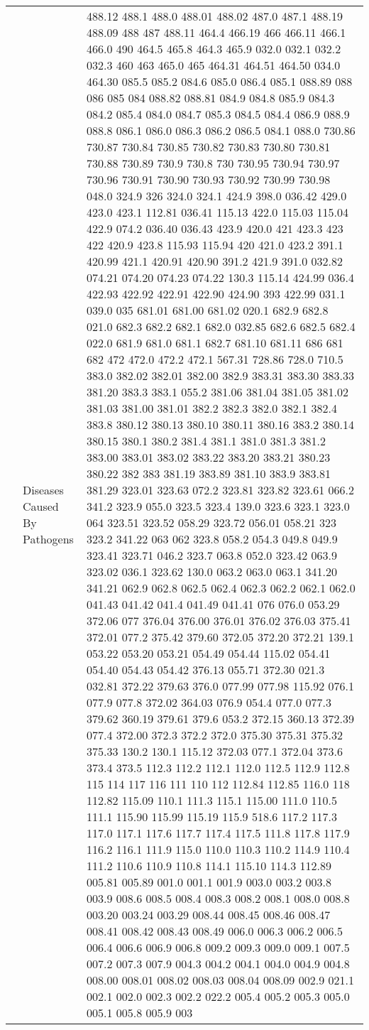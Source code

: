 \begin{longtable}{|R{.05in}|L{.5in}||L{5.75in}|}
    & Diseases Caused By Pathogens &  488.12 488.1 488.0 488.01 488.02 487.0 487.1 488.19 488.09 488 487 488.11 464.4 466.19 466 466.11 466.1 466.0 490 464.5 465.8 464.3 465.9 032.0 032.1 032.2 032.3 460 463 465.0 465 464.31 464.51 464.50 034.0 464.30 085.5 085.2 084.6 085.0 086.4 085.1 088.89 088 086 085 084 088.82 088.81 084.9 084.8 085.9 084.3 084.2 085.4 084.0 084.7 085.3 084.5 084.4 086.9 088.9 088.8 086.1 086.0 086.3 086.2 086.5 084.1 088.0 730.86 730.87 730.84 730.85 730.82 730.83 730.80 730.81 730.88 730.89 730.9 730.8 730 730.95 730.94 730.97 730.96 730.91 730.90 730.93 730.92 730.99 730.98 048.0 324.9 326 324.0 324.1 424.9 398.0 036.42 429.0 423.0 423.1 112.81 036.41 115.13 422.0 115.03 115.04 422.9 074.2 036.40 036.43 423.9 420.0 421 423.3 423 422 420.9 423.8 115.93 115.94 420 421.0 423.2 391.1 420.99 421.1 420.91 420.90 391.2 421.9 391.0 032.82 074.21 074.20 074.23 074.22 130.3 115.14 424.99 036.4 422.93 422.92 422.91 422.90 424.90 393 422.99 031.1 039.0 035 681.01 681.00 681.02 020.1 682.9 682.8 021.0 682.3 682.2 682.1 682.0 032.85 682.6 682.5 682.4 022.0 681.9 681.0 681.1 682.7 681.10 681.11 686 681 682 472 472.0 472.2 472.1 567.31 728.86 728.0 710.5 383.0 382.02 382.01 382.00 382.9 383.31 383.30 383.33 381.20 383.3 383.1 055.2 381.06 381.04 381.05 381.02 381.03 381.00 381.01 382.2 382.3 382.0 382.1 382.4 383.8 380.12 380.13 380.10 380.11 380.16 383.2 380.14 380.15 380.1 380.2 381.4 381.1 381.0 381.3 381.2 383.00 383.01 383.02 383.22 383.20 383.21 380.23 380.22 382 383 381.19 383.89 381.10 383.9 383.81 381.29 323.01 323.63 072.2 323.81 323.82 323.61 066.2 341.2 323.9 055.0 323.5 323.4 139.0 323.6 323.1 323.0 064 323.51 323.52 058.29 323.72 056.01 058.21 323 323.2 341.22 063 062 323.8 058.2 054.3 049.8 049.9 323.41 323.71 046.2 323.7 063.8 052.0 323.42 063.9 323.02 036.1 323.62 130.0 063.2 063.0 063.1 341.20 341.21 062.9 062.8 062.5 062.4 062.3 062.2 062.1 062.0 041.43 041.42 041.4 041.49 041.41 076 076.0 053.29 372.06 077 376.04 376.00 376.01 376.02 376.03 375.41 372.01 077.2 375.42 379.60 372.05 372.20 372.21 139.1 053.22 053.20 053.21 054.49 054.44 115.02 054.41 054.40 054.43 054.42 376.13 055.71 372.30 021.3 032.81 372.22 379.63 376.0 077.99 077.98 115.92 076.1 077.9 077.8 372.02 364.03 076.9 054.4 077.0 077.3 379.62 360.19 379.61 379.6 053.2 372.15 360.13 372.39 077.4 372.00 372.3 372.2 372.0 375.30 375.31 375.32 375.33 130.2 130.1 115.12 372.03 077.1 372.04 373.6 373.4 373.5 112.3 112.2 112.1 112.0 112.5 112.9 112.8 115 114 117 116 111 110 112 112.84 112.85 116.0 118 112.82 115.09 110.1 111.3 115.1 115.00 111.0 110.5 111.1 115.90 115.99 115.19 115.9 518.6 117.2 117.3 117.0 117.1 117.6 117.7 117.4 117.5 111.8 117.8 117.9 116.2 116.1 111.9 115.0 110.0 110.3 110.2 114.9 110.4 111.2 110.6 110.9 110.8 114.1 115.10 114.3 112.89 005.81 005.89 001.0 001.1 001.9 003.0 003.2 003.8 003.9 008.6 008.5 008.4 008.3 008.2 008.1 008.0 008.8 003.20 003.24 003.29 008.44 008.45 008.46 008.47 008.41 008.42 008.43 008.49 006.0 006.3 006.2 006.5 006.4 006.6 006.9 006.8 009.2 009.3 009.0 009.1 007.5 007.2 007.3 007.9 004.3 004.2 004.1 004.0 004.9 004.8 008.00 008.01 008.02 008.03 008.04 008.09 002.9 021.1 002.1 002.0 002.3 002.2 022.2 005.4 005.2 005.3 005.0 005.1 005.8 005.9 003 
\end{longtable}
